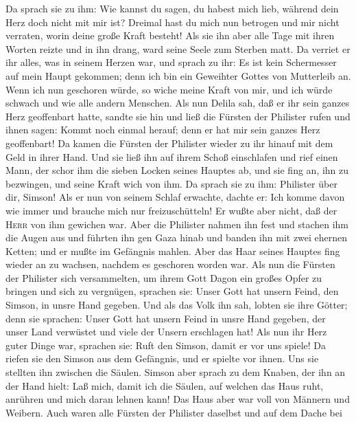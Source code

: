  Da sprach sie zu ihm: Wie kannst du sagen, du habest
mich lieb, während dein Herz doch nicht mit mir ist? Dreimal hast du
mich nun betrogen und mir nicht verraten, worin deine große Kraft
besteht!  Als sie ihn aber alle Tage mit ihren Worten
reizte und in ihn drang, ward seine Seele zum Sterben matt.
 Da verriet er ihr alles, was in seinem Herzen war, und
sprach zu ihr: Es ist kein Schermesser auf mein Haupt gekommen; denn ich
bin ein Geweihter Gottes von Mutterleib an. Wenn ich nun geschoren
würde, so wiche meine Kraft von mir, und ich würde schwach und wie alle
andern Menschen.  Als nun Delila sah, daß er ihr sein
ganzes Herz geoffenbart hatte, sandte sie hin und ließ die Fürsten der
Philister rufen und ihnen sagen: Kommt noch einmal herauf; denn er hat
mir sein ganzes Herz geoffenbart! Da kamen die Fürsten der Philister
wieder zu ihr hinauf mit dem Geld in ihrer Hand.  Und sie
ließ ihn auf ihrem Schoß einschlafen und rief einen Mann, der schor ihm
die sieben Locken seines Hauptes ab, und sie fing an, ihn zu bezwingen,
und seine Kraft wich von ihm.  Da sprach sie zu ihm:
Philister über dir, Simson! Als er nun von seinem Schlaf erwachte,
dachte er: Ich komme davon wie immer und brauche mich nur
freizuschütteln! Er wußte aber nicht, daß der \textsc{Herr} von ihm
gewichen war.  Aber die Philister nahmen ihn fest und
stachen ihm die Augen aus und führten ihn gen Gaza hinab und banden ihn
mit zwei ehernen Ketten; und er mußte im Gefängnis mahlen.
 Aber das Haar seines Hauptes fing wieder an zu wachsen,
nachdem es geschoren worden war.  Als nun die Fürsten der
Philister sich versammelten, um ihrem Gott Dagon ein großes Opfer zu
bringen und sich zu vergnügen, sprachen sie: Unser Gott hat unsern
Feind, den Simson, in unsre Hand gegeben.  Und als das
Volk ihn sah, lobten sie ihre Götter; denn sie sprachen: Unser Gott hat
unsern Feind in unsre Hand gegeben, der unser Land verwüstet und viele
der Unsern erschlagen hat!  Als nun ihr Herz guter Dinge
war, sprachen sie: Ruft den Simson, damit er vor uns spiele! Da riefen
sie den Simson aus dem Gefängnis, und er spielte vor ihnen. Uns sie
stellten ihn zwischen die Säulen.  Simson aber sprach zu
dem Knaben, der ihn an der Hand hielt: Laß mich, damit ich die Säulen,
auf welchen das Haus ruht, anrühren und mich daran lehnen kann!
 Das Haus aber war voll von Männern und Weibern. Auch
waren alle Fürsten der Philister daselbst und auf dem Dache bei
